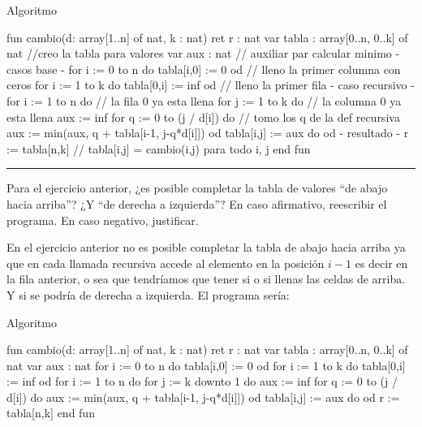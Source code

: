 \begin{codebox}{Algoritmo}
\begin{pascallike}
fun cambio(d: array[1..n] of nat, k : nat) ret r : nat
	var tabla : array[0..n, 0..k] of nat //creo la tabla para valores
	var aux : nat // auxiliar par calcular minimo
	{- casos base -}
	for i := 0 to n do tabla[i,0] := 0 od // lleno la primer columna con ceros 
	for i := 1 to k do tabla[0,i] := inf od // lleno la primer fila
	{- caso recursivo -}
	for i := 1 to n do // la fila 0 ya esta llena
		for j := 1 to k do // la columna 0 ya esta llena
			aux := inf 
			for q := 0 to (j / d[i]) do // tomo los q de la def recursiva
				aux := min(aux, q + tabla[i-1, j-q*d[i]]) 
			od
			tabla[i,j] := aux
		do
	od
	{- resultado -}
	r := tabla[n,k] // tabla[i,j] = cambio(i,j) para todo i, j
end fun 
\end{pascallike}
\end{codebox}

\begin{center}
    \rule{\textwidth}{0.4pt}
\end{center}

Para el ejercicio anterior, ¿es posible completar la tabla de valores “de abajo hacia arriba”? ¿Y “de derecha a izquierda”? En caso afirmativo, reescribir el programa. En caso negativo, justificar.

En el ejercicio anterior no es posible completar la tabla de abajo hacia arriba ya que en cada llamada recursiva accede al elemento en la posición $i-1$ es decir en la fila anterior, o sea que tendríamos que tener si o si llenas las celdas de arriba. Y si se podría de derecha a izquierda. El programa sería:

\begin{codebox}{Algoritmo}
\begin{pascallike}
fun cambio(d: array[1..n] of nat, k : nat) ret r : nat
	var tabla : array[0..n, 0..k] of nat 
	var aux : nat 
	for i := 0 to n do tabla[i,0] := 0 od  
	for i := 1 to k do tabla[0,i] := inf od 
	for i := 1 to n do 
		for j := k downto 1 do 
			aux := inf 
			for q := 0 to (j / d[i]) do 
				aux := min(aux, q + tabla[i-1, j-q*d[i]]) 
			od
			tabla[i,j] := aux
		do
	od
	r := tabla[n,k] 
end fun 
\end{pascallike}
\end{codebox}